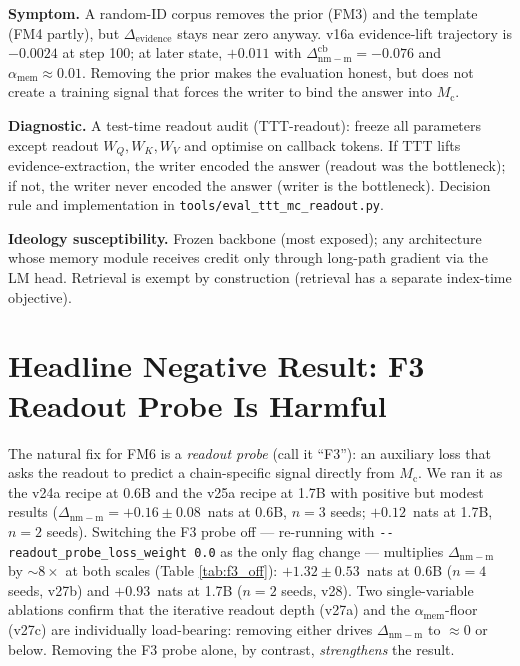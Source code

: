 \documentclass{article}
\newcommand{\Mc}{M_{\mathrm{c}}}
\newcommand{\dnm}{\Delta_{\mathrm{nm-m}}}
\newcommand{\elift}{\Delta_{\mathrm{evidence}}}
\newcommand{\amem}{\alpha_{\mathrm{mem}}}
\begin{document}
\textbf{Symptom.}  A random-ID corpus removes the prior (FM3) and
the template (FM4 partly), but $\elift$ stays near zero anyway.
v16a evidence-lift trajectory is $-0.0024$ at step 100; at later
state, $+0.011$ with $\dnm^{\mathrm{cb}}=-0.076$ and
$\amem \approx 0.01$.  Removing the prior makes the evaluation
honest, but does not create a training signal that forces the
writer to bind the answer into $\Mc$.

\textbf{Diagnostic.}  A test-time readout audit (TTT-readout): freeze
all parameters except readout $W_Q,W_K,W_V$ and optimise on callback
tokens.  If TTT lifts evidence-extraction, the writer encoded the
answer (readout was the bottleneck); if not, the writer never
encoded the answer (writer is the bottleneck).  Decision rule and
implementation in \texttt{tools/eval\_ttt\_mc\_readout.py}.

\textbf{Ideology susceptibility.}  Frozen backbone (most exposed);
any architecture whose memory module receives credit only through
long-path gradient via the LM head.  Retrieval is exempt by
construction (retrieval has a separate index-time objective).

\section{Headline Negative Result: F3 Readout Probe Is Harmful}
\label{sec:f3_off}

The natural fix for FM6 is a \emph{readout probe} (call it ``F3''):
an auxiliary loss that asks the readout to predict a chain-specific
signal directly from $\Mc$.  We ran it as the v24a recipe at 0.6B
and the v25a recipe at 1.7B with positive but modest results
($\dnm = +0.16 \pm 0.08$~nats at 0.6B, $n=3$ seeds;
$+0.12$~nats at 1.7B, $n=2$ seeds).  Switching the F3 probe off ---
re-running with \verb|--readout_probe_loss_weight 0.0| as the only
flag change --- multiplies $\dnm$ by $\sim\!8\times$ at both scales
(Table \ref{tab:f3_off}): $+1.32 \pm 0.53$~nats at 0.6B ($n=4$
seeds, v27b) and $+0.93$~nats at 1.7B ($n=2$ seeds, v28).  Two
single-variable ablations confirm that the iterative readout depth
(v27a) and the $\amem$-floor (v27c) are individually load-bearing:
removing either drives $\dnm$ to $\approx 0$ or below.  Removing the
F3 probe alone, by contrast, \emph{strengthens} the result.
\end{document}
